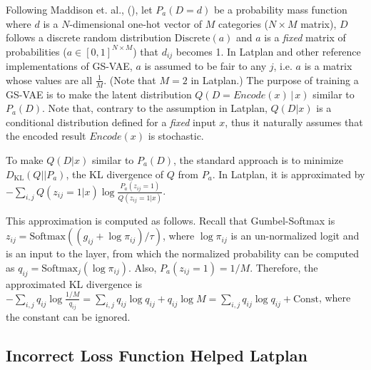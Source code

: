 Following Maddison et. al., (\citeyear[Appendix C.1]{MaddisonMT17}),
let $P_a(D=d)$ be a probability mass function where
$d$ is a $N$-dimensional one-hot vector of $M$ categories ($N\times M$ matrix),
$D$ follows a discrete random distribution $\text{Discrete}(a)$ and
$a$ is a \emph{fixed} matrix of probabilities ($a\in {[0,1]}^{N\times M}$)
that $d_{ij}$ becomes 1.
% 
In Latplan and other reference implementations \cite{ericjanggithub} of GS-VAE,
$a$ is assumed to be fair to any $j$,
i.e. $a$ is a matrix whose values are all $\frac{1}{M}$. (Note that $M=2$ in Latplan.)
The purpose of training a GS-VAE is to make the latent distribution $Q(D=Encode(x)\, |\, x)$ similar to $P_a(D)$.
Note that, contrary to the assumption in Latplan,
$Q(D|x)$ is a conditional distribution defined for a \emph{fixed} input $x$,
thus it naturally assumes that the encoded result $Encode(x)$ is stochastic.


To make $Q(D|x)$ similar to $P_a(D)$, the standard approach is to minimize $D_{\text{KL}}(Q||P_a)$,
the KL divergence of $Q$ from $P_a$.
In Latplan, it is approximated by $- \sum_{i,j} Q(z_{ij}=1|x) \log\frac{P_a(z_{ij}=1)}{Q(z_{ij}=1|x)}$.
\cite[A negated version of Eq.22, which is a maximization objective.]{MaddisonMT17}

This approximation is computed as follows.
Recall that Gumbel-Softmax is $z_{ij} = \text{Softmax}((g_{ij}+\log \pi_{ij})/\tau)$,
where $\log \pi_{ij}$ is an un-normalized logit and is an input to the layer,
from which the normalized probability can be computed as $q_{ij}=\text{Softmax}_j(\log \pi_{ij})$.
Also, $P_a(z_{ij}=1)= 1/M$.
% 
Therefore, the approximated KL divergence is
$-\sum_{i,j} q_{ij} \log \frac{1/M}{q_{ij}} = \sum_{i,j} q_{ij} \log q_{ij} + q_{ij} \log M = \sum_{i,j} q_{ij} \log q_{ij} + \text{Const}$,
where the constant can be ignored.

\subsection{Incorrect Loss Function Helped Latplan}

